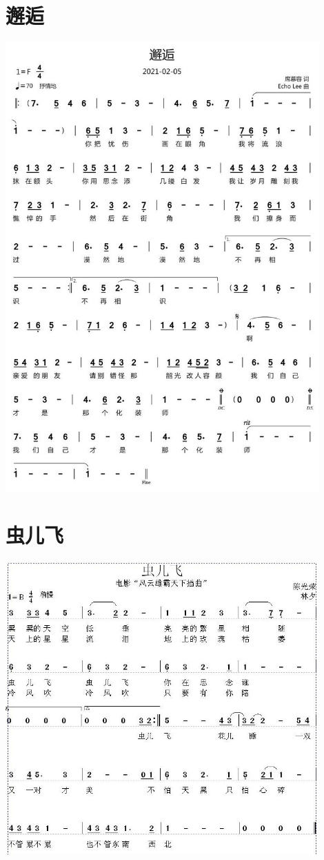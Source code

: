 \documentclass[cn,pad,twocol]{elegantbook}
\begin{document}
\section{邂逅} \includegraphics[width=0.9\textwidth]{macos/20210208邂逅.jpg}
\section{虫儿飞} \includegraphics[width=0.9\textwidth]{macos/20210208虫儿飞.jpg}
\end{document}
